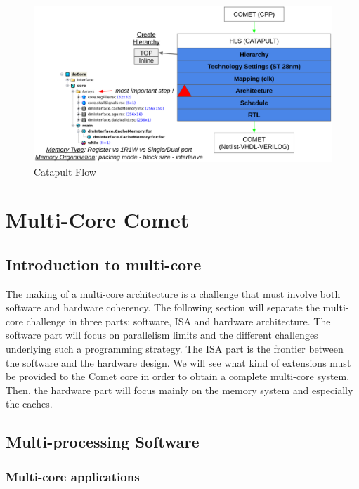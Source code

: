 \documentclass[10pt,letterpaper]{article}
\begin{document}
\begin{figure}[H]
\centering
\includegraphics[width=14cm]{img/HLS_flow.png}
\caption{Catapult Flow}
\label{fig:catapult}
\end{figure}

\newpage

\section{Multi-Core Comet}

\subsection{Introduction to multi-core}

The making of a multi-core architecture is a challenge that must involve both software and hardware coherency. The following section will separate the multi-core challenge in three parts: software, ISA and hardware architecture. The software part will focus on parallelism limits and the different challenges underlying such a programming strategy. The ISA part is the frontier between the software and the hardware design. We will see what kind of extensions must be provided to the Comet core in order to obtain a complete multi-core system. Then, the hardware part will focus mainly on the memory system and especially the caches. 

\subsection{Multi-processing Software}

\subsubsection{Multi-core applications}
\end{document}
